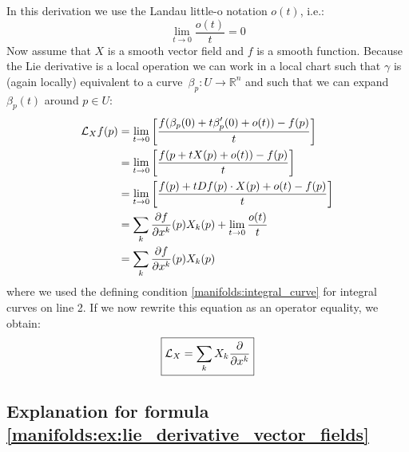 	In this derivation we use the Landau little-o notation $o(t)$, i.e.:
	\begin{equation}
		\lim_{t\rightarrow0}\frac{o(t)}{t} = 0
	\end{equation}
	Now assume that $X$  is a smooth vector field and $f$ is a smooth function. Because the Lie derivative is a local operation we can work in a local chart such that $\gamma$ is (again locally) equivalent to a curve\footnotemark\ $\beta_p:U\rightarrow\mathbb{R}^n$ and such that we can expand $\beta_p(t)$ around $p\in U$:
	\begin{align}
		\mathcal{L}_Xf(p) &= \lim_{t\rightarrow0}\left[\stylefrac{f(\beta_p(0) + t\beta_p'(0) + o(t)) - f(p)}{t}\right]\nonumber\\
		&= \lim_{t\rightarrow0}\left[\stylefrac{f(p + tX(p) + o(t)) - f(p)}{t}\right]\nonumber\\
		&= \lim_{t\rightarrow0}\left[\stylefrac{f(p) + tDf(p)\cdot X(p) + o(t) - f(p)}{t}\right]\nonumber\\
		&= \sum_k\pderiv{f}{x^k}(p)X_k(p) + \lim_{t\rightarrow0}\stylefrac{o(t)}{t}\nonumber\\
		&= \sum_k\pderiv{f}{x^k}(p)X_k(p)\label{manifolds:lie_derivative_calc}
	\end{align}
	where we used the defining condition \ref{manifolds:integral_curve} for integral curves on line 2. If we now rewrite this equation as an operator equality, we obtain:
	\begin{equation}
		\boxed{\mathcal{L}_X = \sum_kX_k\frac{\partial }{\partial x^k}}
	\end{equation}
		
\subsection{Explanation for formula \ref{manifolds:ex:lie_derivative_vector_fields}}

